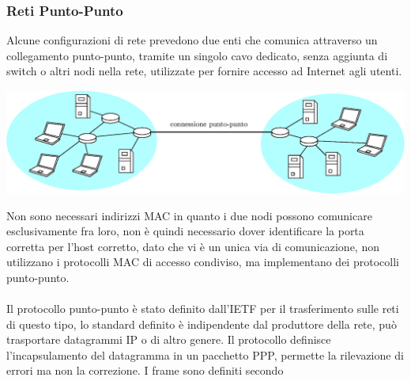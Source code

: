 \documentclass[12pt, letterpaper]{article}
\newcommand{\acc}{\\\hphantom{}\\}
\begin{document}
\subsubsection{Reti Punto-Punto}
Alcune configurazioni di rete prevedono due enti che comunica attraverso un collegamento punto-punto, tramite un singolo 
cavo dedicato, senza aggiunta di switch o altri nodi nella rete, utilizzate per fornire accesso ad Internet agli utenti.
\begin{center}
    \includegraphics[width=\textwidth ]{images/punto-punto.eps}
\end{center}
Non sono necessari indirizzi MAC in quanto i due nodi possono comunicare esclusivamente fra loro, non è quindi necessario 
dover identificare la porta corretta per l'host corretto, dato che vi è un unica via di comunicazione, non utilizzano i 
protocolli MAC di accesso condiviso, ma implementano dei protocolli punto-punto.\acc 
Il protocollo punto-punto è stato definito dall'IETF per il trasferimento sulle reti di questo tipo, lo standard definito 
è indipendente dal produttore della rete, può trasportare datagrammi IP o di altro genere. Il protocollo definisce l'incapsulamento 
del datagramma in un pacchetto PPP, permette la rilevazione di errori ma non la correzione. I frame sono definiti secondo 
\end{document}

